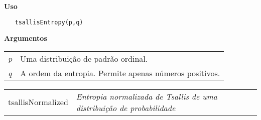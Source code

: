 \documentclass[12pt,letterpaper]{article}
\begin{document}
\vspace{-0.5cm}

\hrulefill  

\vspace{0.5cm}

\textbf{Uso}

\begin{lstlisting}
   tsallisEntropy(p,q)
\end{lstlisting}

\vspace{0.5cm}

\textbf{Argumentos}

\begin{table}[!h]
\begin{center}
\begin{tabularx}{\textwidth}{X X}
\hspace{0.5cm} \textit{p} \vspace{0.5cm}& Uma distribuição de padrão ordinal.\vspace{0.5cm}\\
\hspace{0.5cm} \textit{q} \vspace{0.5cm}& A ordem da entropia. Permite apenas números positivos.\vspace{0.5cm}\\
\end{tabularx}
\end{center}
\end{table} 

\newpage

\hrulefill   

\begin{table}[!h]
\begin{center}
\begin{tabularx}{\textwidth}{ X X}
\hspace{0.5cm} tsallisNormalized & \textit{Entropia normalizada de Tsallis de uma distribuição de probabilidade}\\
\end{tabularx}
\end{center}
\end{table} 

\vspace{-0.5cm}

\hrulefill  

\vspace{0.5cm}
\end{document}
